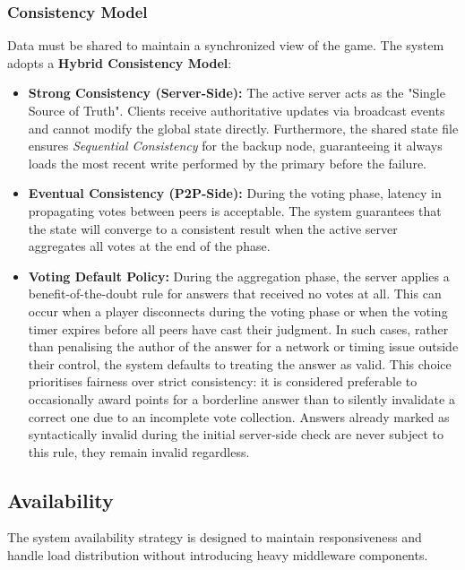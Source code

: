 \documentclass{scrartcl}
\begin{document}
\subsubsection*{Consistency Model}

Data must be shared to maintain a synchronized view of the game. 
The system adopts a \textbf{Hybrid Consistency Model}:

\begin{itemize}
    \item \textbf{Strong Consistency (Server-Side):}
    The active server acts as the "Single Source of Truth".
    Clients receive authoritative updates via broadcast events and cannot modify the global state directly.
    Furthermore, the shared state file ensures \textit{Sequential Consistency} for the backup node,
    guaranteeing it always loads the most recent write performed by the primary before the failure.

    \item \textbf{Eventual Consistency (P2P-Side):}
    During the voting phase, latency in propagating votes between peers is acceptable.
    The system guarantees that the state will converge to a consistent result 
    when the active server aggregates all votes at the end of the phase.

    \item \textbf{Voting Default Policy:}
    During the aggregation phase, the server applies a benefit-of-the-doubt rule for answers
    that received no votes at all. This can occur when a player disconnects during the voting 
    phase or when the voting timer expires before all peers have cast their judgment. 
    In such cases, rather than penalising the author of the answer for a network or timing issue 
    outside their control, the system defaults to treating the answer as valid. 
    This choice prioritises fairness over strict consistency: it is considered preferable 
    to occasionally award points for a borderline answer than to silently invalidate a 
    correct one due to an incomplete vote collection. 
    Answers already marked as syntactically invalid during the initial server-side 
    check are never subject to this rule, they remain invalid regardless.
\end{itemize}

\subsection{Availability}\label{availability}
The system availability strategy is designed to maintain responsiveness 
and handle load distribution without introducing heavy middleware components.
\end{document}
